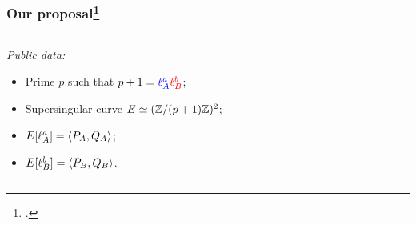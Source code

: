 \documentclass{beamer}
\newcommand{\bl}[1]{\textcolor{blue}{#1}}
\newcommand{\rd}[1]{\textcolor{red}{#1}}
\begin{document}
\begin{frame}
  \frametitle{Our proposal\footcite{jao+defeo2011}}

  \vspace{-1cm}

  \begin{columns}
    \begin{column}{0.4\textwidth}
      \begin{block}{}
        \emph{Public data:}
        \begin{itemize}
          \setlength{\itemsep}{1.5ex}
        \item Prime $p$ such that $p+1 = \bl{\ell_A^a}\rd{\ell_B^b}$;
        \item Supersingular curve \emph{$E\simeq (\mathbb{Z}/(p+1)\mathbb{Z})^2$};
        \item \bl{$E[\ell_A^a] = {\langle P_A,Q_A \rangle}$};
        \item \rd{$E[\ell_B^b] = {\langle P_B,Q_B \rangle}$}.
        \end{itemize}


\end{block}
\end{column}
\end{columns}
\end{frame}
\end{document}
